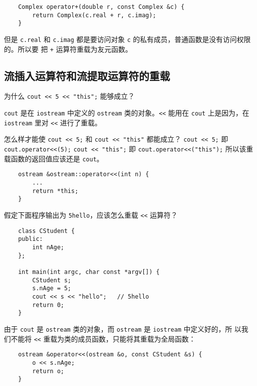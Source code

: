 \documentclass[UTF8]{ctexart}
\begin{document}
\begin{verbatim}
    Complex operator+(double r, const Complex &c) {
        return Complex(c.real + r, c.imag);
    }
\end{verbatim}

但是 \texttt{c.real} 和 \texttt{c.imag} 都是要访问对象 \texttt{c} 的私有成员，普通函数是没有访问权限的。所以要
把 \texttt{+} 运算符重载为友元函数。

\subsection{流插入运算符和流提取运算符的重载}
为什么 \texttt{cout << 5 << "this";} 能够成立？

\texttt{cout} 是在 \texttt{iostream} 中定义的 \texttt{ostream} 类的对象。\texttt{<<}
能用在 \texttt{cout} 上是因为，在 \texttt{iostream} 里对 \texttt{<<} 进行了重载。

怎么样才能使 \texttt{cout << 5;} 和 \texttt{cout << "this"} 都能成立？
\texttt{cout << 5;} 即 \texttt{cout.operator<<(5);} \texttt{cout << "this";}
即 \texttt{cout.operator<<("this");} 所以该重载函数的返回值应该还是 \texttt{cout}。

\begin{verbatim}
    ostream &ostream::operator<<(int n) {
        ...
        return *this;
    }
\end{verbatim}

假定下面程序输出为 \texttt{5hello}，应该怎么重载 \texttt{<<} 运算符？
\begin{verbatim}
    class CStudent {
    public:
        int nAge;
    };

    int main(int argc, char const *argv[]) {
        CStudent s;
        s.nAge = 5;
        cout << s << "hello";   // 5hello
        return 0;
    }
\end{verbatim}

由于 \texttt{cout} 是 \texttt{ostream} 类的对象，而 \texttt{ostream} 是 \texttt{iostream} 中定义好的，所
以我们不能将 \texttt{<<} 重载为类的成员函数，只能将其重载为全局函数：
\begin{verbatim}
    ostream &operator<<(ostream &o, const CStudent &s) {
        o << s.nAge;
        return o;
    }
\end{verbatim}
\end{document}
